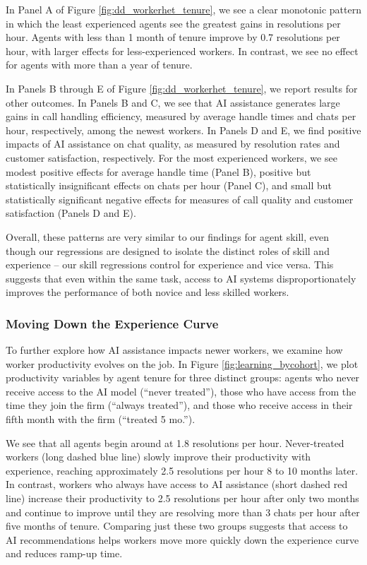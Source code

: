 \documentclass[11pt]{article}
\begin{document}
In Panel A of Figure \ref{fig:dd_workerhet_tenure}, we see a clear monotonic pattern in which the least experienced agents see the greatest gains in resolutions per hour.  Agents with less than 1 month of tenure improve by 0.7 resolutions per hour, with larger effects for less-experienced workers.  In contrast, we see no effect for agents with more than a year of tenure.  

In Panels B through E of Figure \ref{fig:dd_workerhet_tenure}, we report results for other outcomes.  In Panels B and C, we see that AI assistance generates large gains in call handling efficiency, measured by average handle times and chats per hour, respectively, among the newest workers.  In Panels D and E, we find positive impacts of AI assistance on chat quality, as measured by resolution rates and customer satisfaction, respectively.  For the most experienced workers, we see modest positive effects for average handle time (Panel B), positive but statistically insignificant effects on chats per hour (Panel C), and small but statistically significant negative effects for measures of call quality and customer satisfaction (Panels D and E). 

Overall, these patterns are very similar to our findings for agent skill, even though our regressions are designed to isolate the distinct roles of skill and experience -- our skill regressions control for experience and vice versa.  This suggests that even within the same task, access to AI systems disproportionately improves the performance of both novice and less skilled workers.

\subsubsection{Moving Down the Experience Curve}

To further explore how AI assistance impacts newer workers, we examine how worker productivity evolves on the job.
In Figure \ref{fig:learning_bycohort}, we plot productivity variables by agent tenure for three distinct groups: agents who never receive access to the AI model (``never treated''), those who have access from the time they join the firm (``always treated''), and those who receive access in their fifth month with the firm (``treated 5 mo.'').  

We see that all agents begin around at 1.8 resolutions per hour.  Never-treated workers (long dashed blue line) slowly improve their productivity with experience, reaching approximately 2.5 resolutions per hour 8 to 10 months later.  In contrast, workers who always have access to AI assistance (short dashed red line) increase their productivity to 2.5 resolutions per hour after only two months and continue to improve until they are resolving more than 3 chats per hour after five months of tenure.%
Comparing just these two groups suggests that access to AI recommendations helps workers move more quickly down the experience curve and reduces ramp-up time. 
\end{document}
